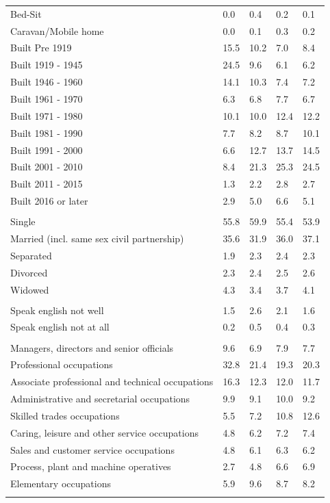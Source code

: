\documentclass{article}
\begin{document}
\begin{table}[h]
\begin{tabular}{KTTTT}
Bed-Sit & 0.0& 0.4& 0.2& 0.1\\
Caravan/Mobile home & 0.0& 0.1& 0.3& 0.2\\
    \hline
Built Pre 1919 & 15.5& 10.2&  7.0&  8.4\\
Built 1919 - 1945 & 24.5&  9.6&  6.1&  6.2\\
Built  1946 - 1960 & 14.1& 10.3&  7.4&  7.2\\
Built  1961 - 1970 & 6.3& 6.8& 7.7& 6.7\\
Built  1971 - 1980 & 10.1& 10.0& 12.4& 12.2\\
Built  1981 - 1990 &  7.7&  8.2&  8.7& 10.1\\
Built  1991 - 2000 &  6.6& 12.7& 13.7& 14.5\\
Built  2001 - 2010 &  8.4& 21.3& 25.3& 24.5\\
Built  2011 - 2015 & 1.3& 2.2& 2.8& 2.7\\
Built  2016 or later & 2.9& 5.0& 6.6& 5.1\\
\hline
    \\
    \hline
Single & 55.8& 59.9& 55.4& 53.9\\
Married (incl. same sex civil partnership) & 35.6& 31.9& 36.0& 37.1\\
Separated  & 1.9& 2.3& 2.4& 2.3\\
Divorced  & 2.3& 2.4& 2.5& 2.6\\
Widowed & 4.3& 3.4& 3.7& 4.1\\
\hline
    \\ 
    \hline
Speak english not well & 1.5& 2.6& 2.1& 1.6\\
Speak english not at all & 0.2& 0.5& 0.4& 0.3\\
\hline
    \\
    \hline
Managers, directors and senior officials & 9.6& 6.9& 7.9& 7.7\\
Professional occupations & 32.8& 21.4& 19.3& 20.3\\
Associate professional and technical occupations & 16.3& 12.3& 12.0& 11.7\\
Administrative and secretarial occupations &  9.9&  9.1& 10.0&  9.2\\
Skilled trades occupations &  5.5&  7.2& 10.8& 12.6\\
Caring, leisure and other service occupations & 4.8& 6.2& 7.2& 7.4\\
Sales and customer service occupations & 4.8& 6.1& 6.3& 6.2\\
Process, plant and machine operatives & 2.7& 4.8& 6.6& 6.9\\
Elementary occupations & 5.9& 9.6& 8.7& 8.2\\
\hline
\end{tabular}
\end{table}
\end{document}
